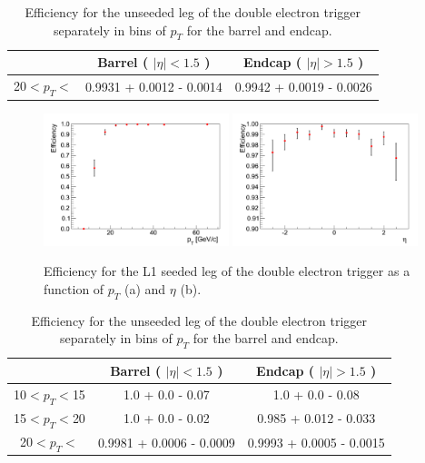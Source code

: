 \begin{table}[!ht]
\begin{center}
\begin{tabular}{|c|c|c|} \hline
              & Barrel ( $|\eta|<1.5$ )  & Endcap ( $|\eta|>1.5$ )  \\ 
\hline
20$<p_{T}<$   & 0.9931 + 0.0012 - 0.0014 & 0.9942 + 0.0019 - 0.0026 \\
\hline
\end{tabular}
\caption{Efficiency for the unseeded leg of the double electron trigger 
separately in bins of $p_{T}$ for the barrel and endcap.
\label{tab:Ele17Ele8TriggerEfficiencySeededLeg}}
\end{center}
\end{table}


\begin{figure}[!h]
\begin{center}
\includegraphics[width=0.48\textwidth]{figures/ElectronTriggerEffVsPt_Ele17Ele8WithL1Seed.pdf}
\includegraphics[width=0.48\textwidth]{figures/ElectronTriggerEffVsEta_Ele17Ele8WithL1Seed.pdf}
\end{center}
\caption{Efficiency for the L1 seeded leg of the double electron trigger as a function of $p_{T}$ (a) and $\eta$ (b).}
\label{fig:Ele17Ele8TriggerEfficiencySeededLeg}
\end{figure} 


\begin{table}[!ht]
\begin{center}
\begin{tabular}{|c|c|c|} 
\hline
              & Barrel ( $|\eta|<1.5$ )  & Endcap ( $|\eta|>1.5$ )  \\ 
\hline
10$<p_{T}<$15 & 1.0 + 0.0 - 0.07 & 1.0 + 0.0 - 0.08                 \\
15$<p_{T}<$20 & 1.0 + 0.0 - 0.02 & 0.985 + 0.012 - 0.033            \\
20$<p_{T}<$   & 0.9981 + 0.0006 - 0.0009 & 0.9993 + 0.0005 - 0.0015 \\
\hline
\end{tabular}
\caption{Efficiency for the unseeded leg of the double electron trigger 
separately in bins of $p_{T}$ for the barrel and endcap.
\label{tab:Ele17Ele8TriggerEfficiencyUnseededLeg}}
\end{center}
\end{table}


